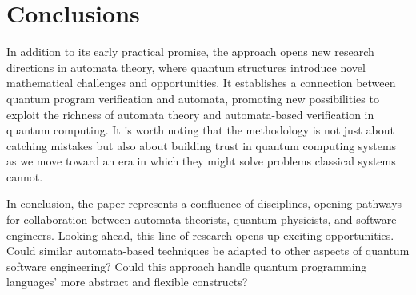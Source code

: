 \section{Conclusions}
In addition to its early practical promise,  the approach opens new research directions in automata theory, where quantum structures introduce novel mathematical challenges and opportunities.
%
It establishes a connection between quantum program verification and automata, promoting new possibilities to
exploit the richness of automata theory and automata-based verification in quantum computing.
%
It is worth noting that the methodology is not just about catching mistakes but also about building trust in quantum computing systems as we move toward an era in which they might solve problems classical systems cannot.


In conclusion, the paper represents a confluence of disciplines, opening pathways for collaboration between automata theorists, quantum physicists, and software engineers. 
%
Looking ahead, this line of research opens up exciting opportunities. Could similar automata-based techniques be adapted to other aspects of quantum software engineering? Could this approach handle quantum programming languages' more abstract and flexible constructs? 

